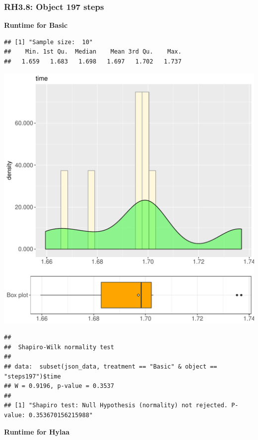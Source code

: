 \documentclass{article}\usepackage[]{graphicx}\usepackage[]{color}
\makeatletter
\def\maxwidth{ %
  \ifdim\Gin@nat@width>\linewidth
    \linewidth
  \else
    \Gin@nat@width
  \fi
}
\newenvironment{kframe}{%
 \def\at@end@of@kframe{}%
 \ifinner\ifhmode%
  \def\at@end@of@kframe{\end{minipage}}%
  \begin{minipage}{\columnwidth}%
 \fi\fi%
 \def\FrameCommand##1{\hskip\@totalleftmargin \hskip-\fboxsep
 \colorbox{shadecolor}{##1}\hskip-\fboxsep
     \hskip-\linewidth \hskip-\@totalleftmargin \hskip\columnwidth}%
 \MakeFramed {\advance\hsize-\width
   \@totalleftmargin\z@ \linewidth\hsize
   \@setminipage}}%
 {\par\unskip\endMakeFramed%
 \at@end@of@kframe}
\newenvironment{knitrout}{}{} %
\makeatother
\begin{document}
\subsubsection{RH3.8: Object 197 steps}

 \textbf{Runtime for Basic}
\begin{knitrout}
\color{fgcolor}\begin{kframe}
\begin{verbatim}
## [1] "Sample size:  10"
##    Min. 1st Qu.  Median    Mean 3rd Qu.    Max. 
##   1.659   1.683   1.698   1.697   1.702   1.737
\end{verbatim}
\end{kframe}
\includegraphics[width=\maxwidth]{figure/RH3_Basic_steps197-1} 
\begin{kframe}\begin{verbatim}
## 
## 	Shapiro-Wilk normality test
## 
## data:  subset(json_data, treatment == "Basic" & object == "steps197")$time
## W = 0.9196, p-value = 0.3537
## 
## [1] "Shapiro test: Null Hypothesis (normality) not rejected. P-value: 0.353670156215988"
\end{verbatim}
\end{kframe}
\end{knitrout}
 \textbf{Runtime for Hylaa}
\end{document}
